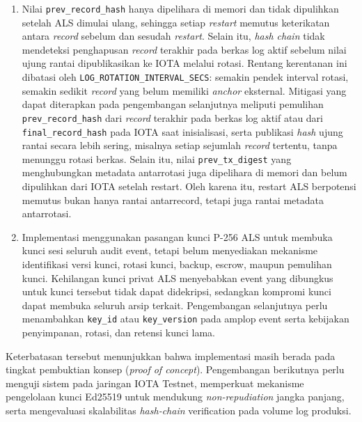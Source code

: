 \begin{enumerate}
    \item Nilai \texttt{prev\_record\_hash} hanya dipelihara di memori dan tidak dipulihkan setelah ALS dimulai ulang,
    sehingga setiap \textit{restart} memutus keterikatan antara \textit{record}
    sebelum dan sesudah \textit{restart}. Selain itu, \textit{hash chain} tidak
    mendeteksi penghapusan \textit{record} terakhir pada berkas log aktif sebelum nilai ujung rantai dipublikasikan ke IOTA melalui rotasi. Rentang kerentanan ini dibatasi oleh \texttt{LOG\_ROTATION\_INTERVAL\_SECS}: semakin
    pendek interval rotasi, semakin sedikit \textit{record} yang belum memiliki
    \textit{anchor} eksternal. Mitigasi yang dapat diterapkan pada pengembangan
    selanjutnya meliputi pemulihan \texttt{prev\_record\_hash} dari \textit{record} terakhir pada berkas log aktif atau dari \texttt{final\_record\_hash} pada IOTA saat inisialisasi, serta publikasi \textit{hash} ujung rantai secara lebih sering, misalnya setiap sejumlah \textit{record} tertentu, tanpa menunggu rotasi berkas. Selain itu, nilai \texttt{prev\_tx\_digest} yang menghubungkan metadata antarrotasi juga dipelihara di memori dan belum dipulihkan dari IOTA setelah restart. Oleh karena itu, restart ALS berpotensi memutus bukan hanya rantai antarrecord, tetapi juga rantai metadata antarrotasi.

    \item Implementasi menggunakan pasangan kunci P-256 ALS untuk membuka kunci sesi seluruh audit event, tetapi belum menyediakan mekanisme identifikasi versi kunci, rotasi kunci, backup, escrow, maupun pemulihan kunci. Kehilangan kunci privat ALS menyebabkan event yang dibungkus untuk kunci tersebut tidak dapat didekripsi, sedangkan kompromi kunci dapat membuka seluruh arsip terkait. Pengembangan selanjutnya perlu menambahkan \texttt{key\_id} atau \texttt{key\_version} pada amplop event serta kebijakan penyimpanan, rotasi, dan retensi kunci lama.
 
\end{enumerate}

Keterbatasan tersebut menunjukkan bahwa implementasi masih berada pada tingkat pembuktian konsep (\textit{proof of concept}). Pengembangan berikutnya perlu menguji sistem pada jaringan IOTA Testnet, memperkuat mekanisme pengelolaan kunci Ed25519 untuk mendukung \textit{non-repudiation} jangka panjang, serta mengevaluasi skalabilitas \textit{hash-chain} verification pada volume log produksi.